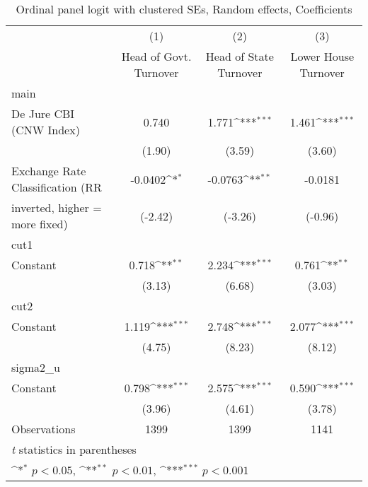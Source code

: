 \begin{table}[htbp]\centering
\def\sym#1{\ifmmode^{#1}\else\(^{#1}\)\fi}
\caption{Ordinal panel logit with clustered SEs, Random effects, Coefficients \label{coeffordLogDJ}}
\begin{tabular}{l*{3}{c}}
\toprule
                                        &\multicolumn{1}{c}{(1)}&\multicolumn{1}{c}{(2)}&\multicolumn{1}{c}{(3)}\\
                                        &\multicolumn{1}{c}{Head of Govt. Turnover}&\multicolumn{1}{c}{Head of State Turnover}&\multicolumn{1}{c}{Lower House Turnover}\\
\midrule
main                                    &                  &                  &                  \\
De Jure CBI (CNW Index)                 &    0.740         &    1.771\sym{***}&    1.461\sym{***}\\
                                        &   (1.90)         &   (3.59)         &   (3.60)         \\
\addlinespace
Exchange Rate Classification (RR        &  -0.0402\sym{*}  &  -0.0763\sym{**} &  -0.0181         \\
inverted, higher = more fixed)          &  (-2.42)         &  (-3.26)         &  (-0.96)         \\
\midrule
cut1                                    &                  &                  &                  \\
Constant                                &    0.718\sym{**} &    2.234\sym{***}&    0.761\sym{**} \\
                                        &   (3.13)         &   (6.68)         &   (3.03)         \\
\midrule
cut2                                    &                  &                  &                  \\
Constant                                &    1.119\sym{***}&    2.748\sym{***}&    2.077\sym{***}\\
                                        &   (4.75)         &   (8.23)         &   (8.12)         \\
\midrule
sigma2\_u                                &                  &                  &                  \\
Constant                                &    0.798\sym{***}&    2.575\sym{***}&    0.590\sym{***}\\
                                        &   (3.96)         &   (4.61)         &   (3.78)         \\
\midrule
Observations                            &     1399         &     1399         &     1141         \\
\bottomrule
\multicolumn{4}{l}{\footnotesize \textit{t} statistics in parentheses}\\
\multicolumn{4}{l}{\footnotesize \sym{*} \(p<0.05\), \sym{**} \(p<0.01\), \sym{***} \(p<0.001\)}\\
\end{tabular}
\end{table}
